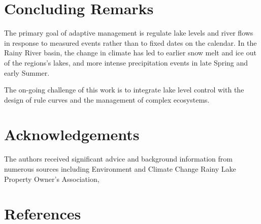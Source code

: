 \documentclass[preprint,times]{elsarticle}
\begin{document}
\section{Concluding Remarks}

The primary goal of adaptive management is regulate lake levels and river flows in response to measured events rather than to fixed dates on the calendar. In the Rainy River basin, the change in climate has led to earlier snow melt and ice out of the regions's lakes, and more intense precipitation events in late Spring and early Summer. 

The on-going challenge of this work is to integrate lake level control with the design of rule curves and the management of complex ecosystems. 
\section{Acknowledgements}

The authors received significant advice and background information from numerous sources including Environment and Climate Change Rainy Lake Property Owner's Association, 

\section{References}
\nocite{*}

\end{document}
